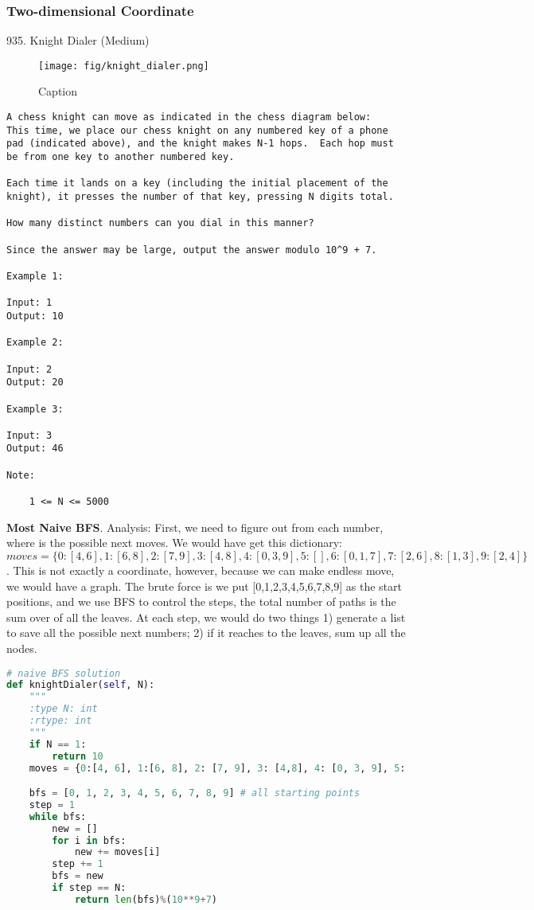 \documentclass[../main.tex]{subfiles}
\begin{document}
\subsubsection{Two-dimensional Coordinate}
935. Knight Dialer (Medium)
\begin{figure}
    \centering
    \texttt{[image: fig/knight\_dialer.png]}
    \caption{Caption}
    \label{fig:my_label}
\end{figure}
\begin{lstlisting}
A chess knight can move as indicated in the chess diagram below:
This time, we place our chess knight on any numbered key of a phone pad (indicated above), and the knight makes N-1 hops.  Each hop must be from one key to another numbered key.

Each time it lands on a key (including the initial placement of the knight), it presses the number of that key, pressing N digits total.

How many distinct numbers can you dial in this manner?

Since the answer may be large, output the answer modulo 10^9 + 7.

Example 1:

Input: 1
Output: 10

Example 2:

Input: 2
Output: 20

Example 3:

Input: 3
Output: 46

Note:

    1 <= N <= 5000
\end{lstlisting}
\textbf{Most Naive BFS}. Analysis: First, we need to figure out from each number, where is the possible next moves.  We would have get this dictionary: $moves = \{0:[4, 6], 1:[6, 8], 2: [7, 9], 3: [4,8], 4: [0, 3, 9], 5:[], 6:[0,1,7], 7:[2,6], 8:[1,3],9:[2,4]\}$. This is not exactly a coordinate, however, because we can make endless move, we would have a graph. The brute force is we put [0,1,2,3,4,5,6,7,8,9] as the start positions, and we use BFS to control the steps, the total number of paths is the sum over of all the leaves. At each step, we would do two things 1) generate a list to save all the possible next numbers; 2) if it reaches to the leaves, sum up all the nodes. 
\begin{lstlisting}[language = Python]
# naive BFS solution
def knightDialer(self, N):
    """
    :type N: int
    :rtype: int
    """
    if N == 1:
        return 10
    moves = {0:[4, 6], 1:[6, 8], 2: [7, 9], 3: [4,8], 4: [0, 3, 9], 5:[], 6:[0,1,7], 7:[2,6], 8:[1,3],9:[2,4]} #4, 6 has three

    bfs = [0, 1, 2, 3, 4, 5, 6, 7, 8, 9] # all starting points
    step = 1
    while bfs:
        new = []
        for i in bfs: 
            new += moves[i]
        step += 1
        bfs = new
        if step == N:
            return len(bfs)%(10**9+7)
\end{lstlisting}
\end{document}
